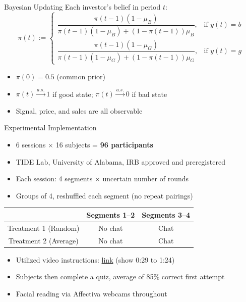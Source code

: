 \documentclass{beamer}
\begin{document}
\begin{frame}{Bayesian Updating}
Each investor's belief in period $t$:
\begin{equation*}
    \pi(t) :=
    \begin{cases}
        \dfrac{\pi(t\!-\!1)(1\!-\!\mu_B)}{\pi(t\!-\!1)(1\!-\!\mu_B) + (1\!-\!\pi(t\!-\!1))\mu_B}, & \text{if } y(t) = b \\[12pt]
        \dfrac{\pi(t\!-\!1)(1\!-\!\mu_G)}{\pi(t\!-\!1)(1\!-\!\mu_G) + (1\!-\!\pi(t\!-\!1))\mu_G}, & \text{if } y(t) = g
    \end{cases}
\end{equation*}

\begin{itemize}
    \item $\pi(0) = 0.5$ (common prior)
    \item $\pi(t) \overset{a.s.}{\to} 1$ if good state; $\pi(t) \overset{a.s.}{\to} 0$ if bad state
    \item Signal, price, and sales are all observable
\end{itemize}
\end{frame}


\begin{frame}{Experimental Implementation}
\begin{itemize}
    \item 6 sessions $\times$ 16 subjects = \textbf{96 participants}
    \item TIDE Lab, University of Alabama, IRB approved and preregistered
    \item Each session: 4 segments $\times$ uncertain number of rounds
    \item Groups of 4, reshuffled each segment (no repeat pairings)
\end{itemize}

\vspace{0.3cm}
\begin{center}
\begin{tabular}{ccc}
\toprule
& \textbf{Segments 1--2} & \textbf{Segments 3--4} \\
\midrule
Treatment 1 (Random) & No chat & Chat \\
Treatment 2 (Average) & No chat & Chat \\
\bottomrule
\end{tabular}
\end{center}

\vspace{0.3cm}
\begin{itemize}
    \item Utilized video instructions: \href{https://youtu.be/5h83uTS_RMc}{link} (show 0:29 to 1:24) 
    \item Subjects then complete a quiz, average of 85\% correct first attempt
    \item Facial reading via Affectiva webcams throughout
\end{itemize}
\end{frame}
\end{document}
